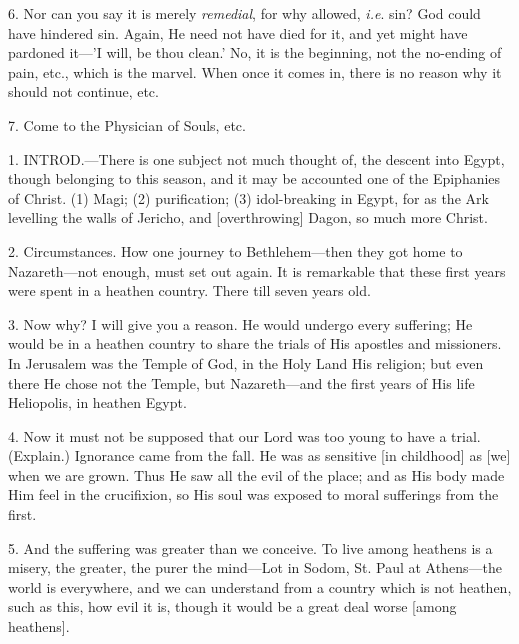 6. Nor can you say it is merely \emph{remedial},
for why allowed, \emph{i.e}. sin? God could have hindered sin. Again,
He need not have died for it, and yet might have pardoned it—'I
will, be thou clean.' No, it is the beginning, not the no-ending of
pain, etc., which is the marvel. When once it comes in, there is no
reason why it should not continue, etc.

7. Come to the Physician of Souls, etc.


1. INTROD.—There
is one subject not much thought of, the descent into Egypt, though
belonging to this season, and it may be accounted one of the
Epiphanies of Christ. (1) Magi; (2) purification; (3) idol-breaking in
Egypt, for as the Ark levelling the walls of Jericho, and
[overthrowing] Dagon, so much more Christ.

2. Circumstances. How one journey to
Bethlehem—then they got home to Nazareth—not enough, must set out
again. It is remarkable that these first years were spent in a heathen
country. There till seven years old.

3. Now why? I will give you a reason. He would
undergo every suffering; He would be in a heathen country to share the
trials of His apostles and missioners. In Jerusalem was the Temple of
God, in the Holy Land His religion; but even there He chose not the
Temple, but Nazareth—and the first years of His life Heliopolis, in
heathen Egypt.

4. Now it must not be supposed that our Lord was
too young to have a trial. (Explain.) Ignorance came from the fall. He
was as sensitive [in childhood] as [we] when we are grown. Thus He saw
all the evil of the place; and as His body made Him feel in the
crucifixion, so His soul was exposed to moral sufferings from the
first.

5. And the suffering was greater than we
conceive. To live among heathens is a misery, the greater, the purer
the mind—Lot in Sodom, St. Paul at Athens—the world is everywhere,
and we can understand from a country which is not heathen, such as
this, how evil it is, though it would be a great deal worse [among
heathens].

